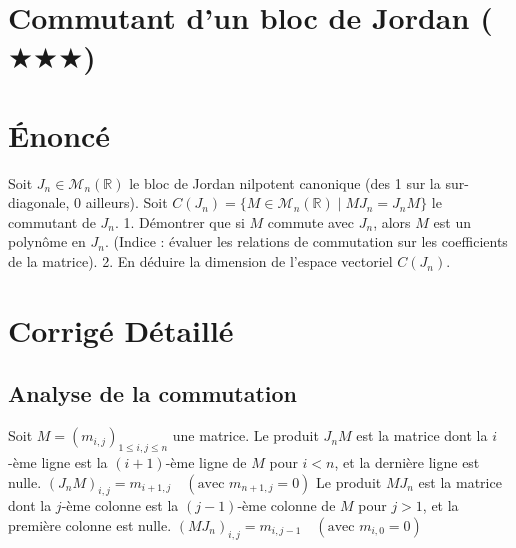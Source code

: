 \documentclass[11pt,a4paper]{article}
\begin{document}
\section{Commutant d'un bloc de Jordan ($\bigstar$$\bigstar$$\bigstar$)}

\section{Énoncé}
Soit $J_n \in \mathcal{M}_n(\mathbb{R})$ le bloc de Jordan nilpotent canonique (des 1 sur la sur-diagonale, 0 ailleurs).
Soit $C(J_n) = \{ M \in \mathcal{M}_n(\mathbb{R}) \mid M J_n = J_n M \}$ le commutant de $J_n$.
1. Démontrer que si $M$ commute avec $J_n$, alors $M$ est un polynôme en $J_n$. (Indice : évaluer les relations de commutation sur les coefficients de la matrice).
2. En déduire la dimension de l'espace vectoriel $C(J_n)$.

\section{Corrigé Détaillé}

\subsection{Analyse de la commutation}
Soit $M = (m_{i,j})_{1 \le i,j \le n}$ une matrice.
Le produit $J_n M$ est la matrice dont la $i$-ème ligne est la $(i+1)$-ème ligne de $M$ pour $i<n$, et la dernière ligne est nulle.
$(J_n M)_{i,j} = m_{i+1, j} \quad (\text{avec } m_{n+1, j} = 0)$
Le produit $M J_n$ est la matrice dont la $j$-ème colonne est la $(j-1)$-ème colonne de $M$ pour $j>1$, et la première colonne est nulle.
$(M J_n)_{i,j} = m_{i, j-1} \quad (\text{avec } m_{i, 0} = 0)$
\end{document}
